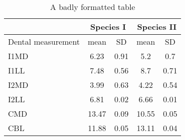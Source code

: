 \begin{table}
  \caption{A badly formatted table}
  \centering
  \label{table:bad_table}
  \begin{tabular}{|l|c|c|c|c|}
    \hline
                       & \multicolumn{2}{c}{Species I} & \multicolumn{2}{c|}{Species II}                \\
    \hline
    Dental measurement & mean                          & SD                              & mean  & SD   \\ \hline
    \hline
    I1MD               & 6.23                          & 0.91                            & 5.2   & 0.7  \\
    \hline
    I1LL               & 7.48                          & 0.56                            & 8.7   & 0.71 \\
    \hline
    I2MD               & 3.99                          & 0.63                            & 4.22  & 0.54 \\
    \hline
    I2LL               & 6.81                          & 0.02                            & 6.66  & 0.01 \\
    \hline
    CMD                & 13.47                         & 0.09                            & 10.55 & 0.05 \\
    \hline
    CBL                & 11.88                         & 0.05                            & 13.11 & 0.04 \\
    \hline
  \end{tabular}
\end{table}

